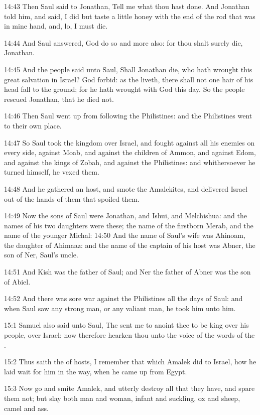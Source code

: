 14:43 Then Saul said to Jonathan, Tell me what thou hast done. And
Jonathan told him, and said, I did but taste a little honey with the
end of the rod that was in mine hand, and, lo, I must die.

14:44 And Saul answered, God do so and more also: for thou shalt
surely die, Jonathan.

14:45 And the people said unto Saul, Shall Jonathan die, who hath
wrought this great salvation in Israel? God forbid: as the \LORD
liveth, there shall not one hair of his head fall to the ground; for
he hath wrought with God this day. So the people rescued Jonathan,
that he died not.

14:46 Then Saul went up from following the Philistines: and the
Philistines went to their own place.

14:47 So Saul took the kingdom over Israel, and fought against all his
enemies on every side, against Moab, and against the children of
Ammon, and against Edom, and against the kings of Zobah, and against
the Philistines: and whithersoever he turned himself, he vexed them.

14:48 And he gathered an host, and smote the Amalekites, and delivered
Israel out of the hands of them that spoiled them.

14:49 Now the sons of Saul were Jonathan, and Ishui, and Melchishua:
and the names of his two daughters were these; the name of the
firstborn Merab, and the name of the younger Michal: 14:50 And the
name of Saul's wife was Ahinoam, the daughter of Ahimaaz: and the name
of the captain of his host was Abner, the son of Ner, Saul's uncle.

14:51 And Kish was the father of Saul; and Ner the father of Abner was
the son of Abiel.

14:52 And there was sore war against the Philistines all the days of
Saul: and when Saul saw any strong man, or any valiant man, he took
him unto him.

15:1 Samuel also said unto Saul, The \LORD sent me to anoint thee to be
king over his people, over Israel: now therefore hearken thou unto the
voice of the words of the \LORD.

15:2 Thus saith the \LORD of hosts, I remember that which Amalek did to
Israel, how he laid wait for him in the way, when he came up from
Egypt.

15:3 Now go and smite Amalek, and utterly destroy all that they have,
and spare them not; but slay both man and woman, infant and suckling,
ox and sheep, camel and ass.

